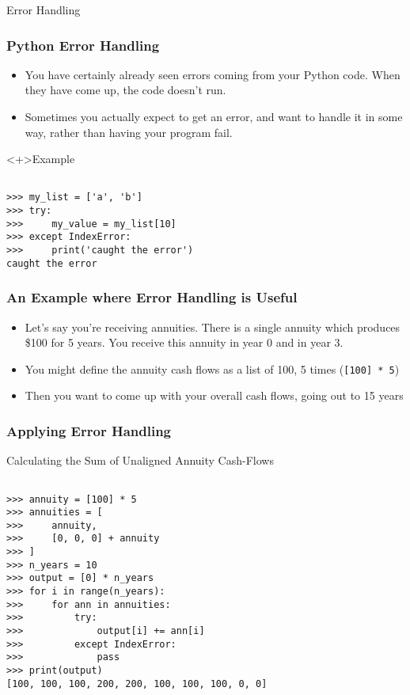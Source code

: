 \documentclass[handout, 11pt]{beamer}
\begin{document}
\begin{section}[Errors]{Error Handling}
\begin{frame}[fragile]
\frametitle{Python Error Handling}
\begin{itemize}
\item You have certainly already seen errors coming from your Python code. When they have come up, the code doesn't run.
\vfill
\item Sometimes you actually expect to get an error, and want to handle it in some way, rather than having your program fail.
\end{itemize}
\begin{block}<+>{Example}
\begin{verbatim}

>>> my_list = ['a', 'b']
>>> try:
>>>     my_value = my_list[10]
>>> except IndexError:
>>>     print('caught the error')
caught the error

\end{verbatim}
\end{block}
\end{frame}
\begin{frame}
\frametitle{An Example where Error Handling is Useful}
\begin{itemize}
\item Let's say you're receiving annuities. There is a single annuity which produces \$100 for 5 years. You receive this annuity in year 0 and in year 3.
\vfill
\item You might define the annuity cash flows as a list of 100, 5 times (\texttt{[100] * 5})
\vfill
\item Then you want to come up with your overall cash flows, going out to 15 years
\end{itemize}
\end{frame}
\begin{frame}[fragile]
\frametitle{Applying Error Handling}
\begin{block}{Calculating the Sum of Unaligned Annuity Cash-Flows}
\small
\begin{verbatim}

>>> annuity = [100] * 5
>>> annuities = [
>>>     annuity,
>>>     [0, 0, 0] + annuity
>>> ]
>>> n_years = 10
>>> output = [0] * n_years
>>> for i in range(n_years):
>>>     for ann in annuities:
>>>         try:
>>>             output[i] += ann[i]
>>>         except IndexError:
>>>             pass
>>> print(output)   
[100, 100, 100, 200, 200, 100, 100, 100, 0, 0]

\end{verbatim}
\end{block}
\end{frame}
\end{section}
\end{document}
